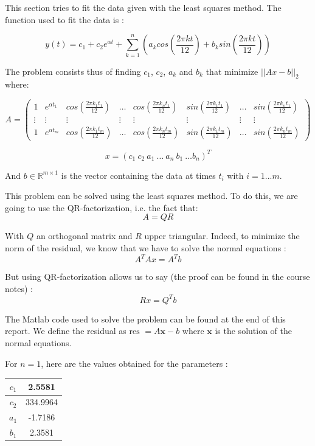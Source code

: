 This section tries to fit the data given with the least squares method. The function used to fit the data is :

$$y(t) = c_1 + c_2e^{\alpha t}+\sum_{k=1}^n (a_k cos(\frac{2\pi kt}{12}) + b_k sin(\frac{2\pi kt}{12}))$$

The problem consists thus of finding $c_1$, $c_2$, $a_k$ and $b_k$ that minimize $||Ax-b||_2$ where:

$$A = \left(\begin{array}{cccccccc}
1 & e^{\alpha t_1} & cos(\frac{2\pi k_1t_1}{12}) & \dots & cos(\frac{2\pi k_nt_1}{12}) & sin(\frac{2\pi k_1t_1}{12}) & \dots & sin(\frac{2\pi k_nt_1}{12}) \\ 
\vdots & \vdots & \vdots & \vdots & \vdots & \vdots & \vdots & \vdots \\ 
1 & e^{\alpha t_m} & cos(\frac{2\pi k_1t_m}{12})& \dots & cos(\frac{2\pi k_nt_m}{12}) & sin(\frac{2\pi k_1t_m}{12}) & \dots & sin(\frac{2\pi k_nt_m}{12})
\end{array} \right)$$

$$x=(c_1 \: c_2 \: a_1 \: \dots \: a_n \: b_1 \: \dots b_n)^T$$

And $b \in \mathbb{R}^{m\times 1}$ is the vector containing the data at times $t_i$ with $i=1...m$.

This problem can be solved using the least squares method. To do this, we are going to use the QR-factorization, i.e. the fact that:
$$A=QR$$

With $Q$ an orthogonal matrix and $R$ upper triangular. Indeed, to minimize the norm of the residual, we know that we have to solve the normal equations :
$$A^TAx=A^Tb$$

But using QR-factorization allows us to say (the proof can be found in the course notes) : 
$$Rx=Q^Tb$$

The Matlab code used to solve the problem can be found at the end of this report. We define the residual as $\text{res } = A\textbf{x}-b$ where $\textbf{x}$ is the solution of the normal equations.


For $n=1$, here are the values obtained for the parameters :

\begin{center}
\begin{tabular}{|c|c|}
\hline 
$c_1$ & 2.5581 \\ 
\hline 
$c_2$ & 334.9964 \\ 
\hline 
$a_1$ & -1.7186 \\ 
\hline 
$b_1$ & 2.3581 \\ 
\hline 
\end{tabular} 
\end{center}

